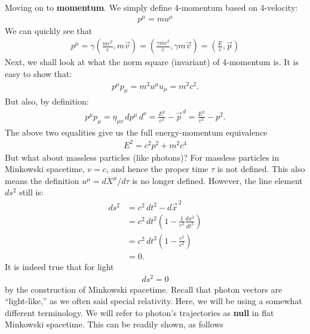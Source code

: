 \documentclass{article}
\theoremstyle{definition}
\begin{document}
Moving on to \textbf{momentum}. We simply define 4-momentum based on 4-velocity:
\begin{align*}
\boxed{p^\mu = mu^\mu}
\end{align*}
We can quickly see that
\begin{align*}
\boxed{p^\mu = \gamma\left(\frac{mc^2}{c}, m\vec{v} \right) = \left( \frac{\gamma m c^2}{c}, \gamma m \vec{v} \right) = \left(\frac{E}{c},\vec{p} \right) }  
\end{align*}
Next, we shall look at what the norm square (invariant) of 4-momentum is. It is easy to show that:
\begin{align*}
p^\mu p_\mu = m^2 u^\mu u_\mu = m^2c^2.
\end{align*}
But also, by definition:
\begin{align*}
p^\mu p_\mu = \eta_{\mu\nu}\,dp^\mu\,d^\nu = \frac{E^2}{c^2} - \vec{p}^{\,d} = \frac{E^2}{c^2} - p^2.
\end{align*}
The above two equalities give us the full energy-momentum equivalence
\begin{align*}
\boxed{E^2 = c^2p^2 + m^2 c^4}
\end{align*}
But what about massless particles (like photons)? For massless particles in Minkowski spacetime, $v=c$, and hence the proper time $\tau$ is not defined. This also means the definition $u^\mu = dX^\mu/d\tau$ is no longer defined. However, the line element $ds^2$ still is:
\begin{align*}
ds^2 &= c^2\,dt^2 - d\vec{x}^{\,2}\\
&=c^2\,dt^2\left( 1 - \frac{1}{c^2}\frac{dx^2}{dt^2}\right)\\
&=c^2\,dt^2\left(1 - \frac{c^2}{c^2} \right)\\
&=0. 
\end{align*}
It is indeed true that for light
\begin{align*}
\boxed{ds^2 = 0}
\end{align*}
by the construction of Minkowski spacetime. Recall that photon vectors are ``light-like,'' as we often said special relativity. Here, we will be using a somewhat different terminology. We will refer to photon's trajectories as \textbf{null} in flat Minkowski spacetime. This can be readily shown, as follows\\
\end{document}
